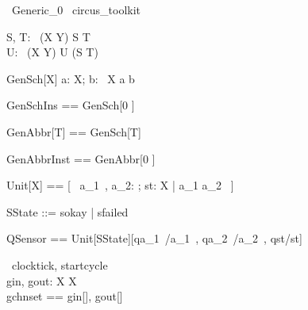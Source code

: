 \documentclass{article} %
\begin{document}
\begin{zsection}
	\SECTION\ Generic\_0 \parents\ circus\_toolkit
\end{zsection}

\begin{gendef}[X, Y]
    S, T: \power~(X \cross Y) 
\where
    S \subseteq T \\
    \exists U: \power~(X \cross Y) \spot U \subset (S \cup T)
\end{gendef}

\begin{schema}{GenSch}[X]
    a: X; b: \power~X
\where
    a \in b
\end{schema}

\begin{zed}
    GenSchIns == GenSch[0 ]
\end{zed}

\begin{zed}
    GenAbbr[T] == GenSch[T]
\end{zed}

\begin{zed}
    GenAbbrInst == GenAbbr[0 ]
\end{zed}

\begin{zed}
  Unit[X] == [~ a\_1~, a\_2: \nat; st: X | a\_1 \leq a\_2 ~]
\end{zed}

\begin{zed}
    SState ::= sokay | sfailed  \\
\end{zed}

\begin{zed}
  QSensor == Unit[SState][qa\_1~/a\_1~, qa\_2~/a\_2~, qst/st]
\end{zed}

\begin{circus}
    \circchannel\ clocktick, startcycle \\
    \circchannel [X] gin, gout: X \cross X  \\
    \circchannelset [X] gchnset == \lchanset gin[\nat], gout[\nat] \rchanset 
\end{circus}
\end{document}
